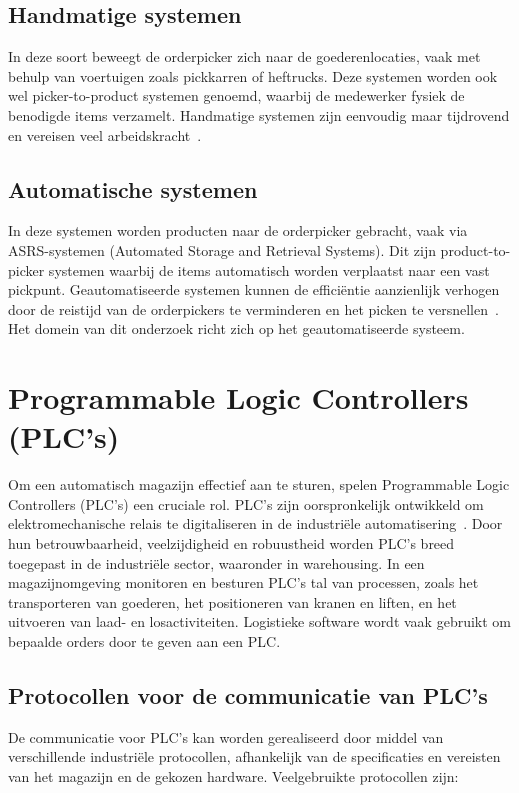 \subsection{Handmatige systemen}
In deze soort beweegt de orderpicker zich naar de goederenlocaties, vaak met behulp van voertuigen zoals pickkarren of heftrucks. 
Deze systemen worden ook wel picker-to-product systemen genoemd, waarbij de medewerker fysiek de benodigde items verzamelt. 
Handmatige systemen zijn eenvoudig maar tijdrovend en vereisen veel arbeidskracht~\autocite{Berg1999}.

\subsection{Automatische systemen}
In deze systemen worden producten naar de orderpicker gebracht, vaak via ASRS-systemen (Automated Storage and Retrieval Systems). 
Dit zijn product-to-picker systemen waarbij de items automatisch worden verplaatst naar een vast pickpunt. 
Geautomatiseerde systemen kunnen de efficiëntie aanzienlijk verhogen door de reistijd van de orderpickers te verminderen 
en het picken te versnellen~\autocite{Berg1999}.
Het domein van dit onderzoek richt zich op het geautomatiseerde systeem. 

\section{Programmable Logic Controllers (PLC’s)}
Om een automatisch magazijn effectief aan te sturen, spelen Programmable Logic Controllers (PLC's) een cruciale rol.
PLC's zijn oorspronkelijk ontwikkeld om elektromechanische relais te digitaliseren in de industriële automatisering~\autocite{Bolton2015}. 
Door hun betrouwbaarheid, veelzijdigheid en robuustheid worden PLC’s breed toegepast in de industriële sector, waaronder in warehousing. 
In een magazijnomgeving monitoren en besturen PLC's tal van processen, zoals het transporteren van goederen, 
het positioneren van kranen en liften, en het uitvoeren van laad- en losactiviteiten.
Logistieke software wordt vaak gebruikt om bepaalde orders door te geven aan een PLC.

\subsection{Protocollen voor de communicatie van PLC's} 
De communicatie voor PLC’s kan worden gerealiseerd door middel van verschillende industriële protocollen, 
afhankelijk van de specificaties en vereisten van het magazijn en de gekozen hardware. 
Veelgebruikte protocollen zijn:

